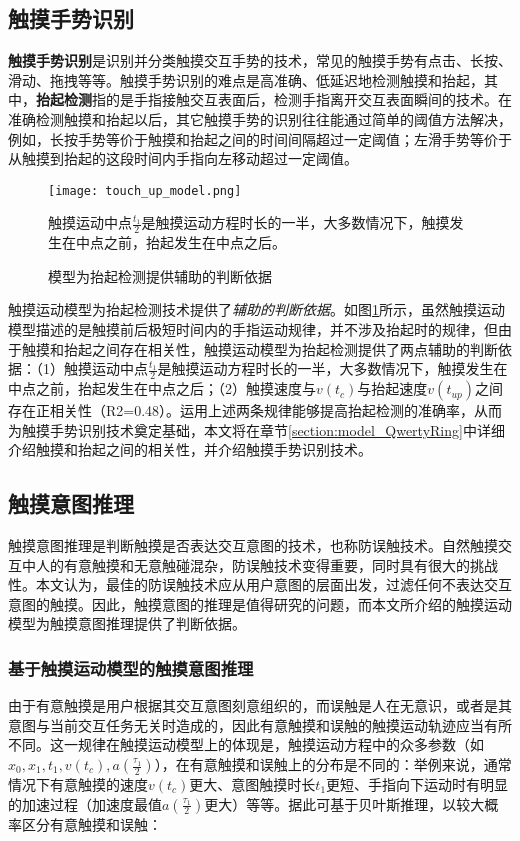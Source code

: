 \subsection{触摸手势识别}

\textbf{触摸手势识别}是识别并分类触摸交互手势的技术，常见的触摸手势有点击、长按、滑动、拖拽等等。触摸手势识别的难点是高准确、低延迟地检测触摸和抬起，其中，\textbf{抬起检测}指的是手指接触交互表面后，检测手指离开交互表面瞬间的技术。在准确检测触摸和抬起以后，其它触摸手势的识别往往能通过简单的阈值方法解决，例如，长按手势等价于触摸和抬起之间的时间间隔超过一定阈值；左滑手势等价于从触摸到抬起的这段时间内手指向左移动超过一定阈值。

\begin{figure}
	\centering
	\texttt{[image: touch\_up\_model.png]}
	\caption*{触摸运动中点$\frac{t_1}{2}$是触摸运动方程时长的一半，大多数情况下，触摸发生在中点之前，抬起发生在中点之后。}
	\caption{模型为抬起检测提供辅助的判断依据}
	\label{fig:touch_up_model}
\end{figure}

触摸运动模型为抬起检测技术提供了\emph{辅助的判断依据}。如图\ref{fig:touch_up_model}所示，虽然触摸运动模型描述的是触摸前后极短时间内的手指运动规律，并不涉及抬起时的规律，但由于触摸和抬起之间存在相关性，触摸运动模型为抬起检测提供了两点辅助的判断依据：（1）触摸运动中点$\frac{t_1}{2}$是触摸运动方程时长的一半，大多数情况下，触摸发生在中点之前，抬起发生在中点之后；（2）触摸速度与$v(t_c)$与抬起速度$v(t_{up})$之间存在正相关性（R2=0.48）。运用上述两条规律能够提高抬起检测的准确率，从而为触摸手势识别技术奠定基础，本文将在章节\ref{section:model_QwertyRing}中详细介绍触摸和抬起之间的相关性，并介绍触摸手势识别技术。

\subsection{触摸意图推理}

触摸意图推理是判断触摸是否表达交互意图的技术，也称防误触技术。自然触摸交互中人的有意触摸和无意触碰混杂，防误触技术变得重要，同时具有很大的挑战性。本文认为，最佳的防误触技术应从用户意图的层面出发，过滤任何不表达交互意图的触摸。因此，触摸意图的推理是值得研究的问题，而本文所介绍的触摸运动模型为触摸意图推理提供了判断依据。

\subsubsection{基于触摸运动模型的触摸意图推理}

由于有意触摸是用户根据其交互意图刻意组织的，而误触是人在无意识，或者是其意图与当前交互任务无关时造成的，因此有意触摸和误触的触摸运动轨迹应当有所不同。这一规律在触摸运动模型上的体现是，触摸运动方程中的众多参数（如$x_0,x_1, t_1,v(t_c),a(\frac{\tau_1}{2})$），在有意触摸和误触上的分布是不同的：举例来说，通常情况下有意触摸的速度$v(t_c)$更大、意图触摸时长$t_1$更短、手指向下运动时有明显的加速过程（加速度最值$a(\frac{\tau_1}{2})$更大）等等。据此可基于贝叶斯推理，以较大概率区分有意触摸和误触：

